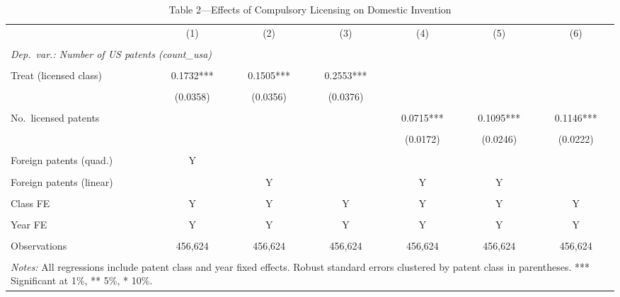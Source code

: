 \begin{table}[htbp]
\centering
\small
\caption{Table 2---Effects of Compulsory Licensing on Domestic Invention}
\label{tab:table2}
\begin{tabular}{lcccccc}
\toprule
 & (1) & (2) & (3) & (4) & (5) & (6) \\\\
\midrule
\multicolumn{7}{l}{\textit{Dep.\ var.: Number of US patents (count\_usa)}} \\\\
\addlinespace
Treat (licensed class) & 0.1732*** & 0.1505*** & 0.2553*** & & & \\\\
 & (0.0358) & (0.0356) & (0.0376) & & & \\\\
\addlinespace
No.\ licensed patents & & & & 0.0715*** & 0.1095*** & 0.1146*** \\\\
 & & & & (0.0172) & (0.0246) & (0.0222) \\\\
\addlinespace
Foreign patents (quad.) & Y & & & & & \\\\
Foreign patents (linear) & & Y & & Y & Y & \\\\
Class FE & Y & Y & Y & Y & Y & Y \\\\
Year FE & Y & Y & Y & Y & Y & Y \\\\
\addlinespace
Observations & 456,624 & 456,624 & 456,624 & 456,624 & 456,624 & 456,624 \\\\
\bottomrule
\multicolumn{7}{p{0.95\linewidth}}{\footnotesize
 \textit{Notes:} All regressions include patent class and year fixed effects.
 Robust standard errors clustered by patent class in parentheses.
 *** Significant at 1\%, ** 5\%, * 10\%.}
\end{tabular}
\end{table}
